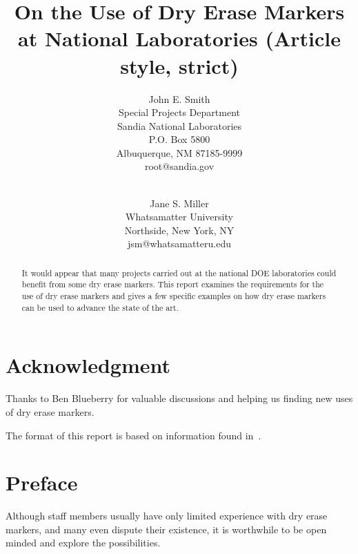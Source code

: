 \documentclass[pdf,ps2pdf,12pt,strict,OUO]{SANDreport}
\title{On the Use of Dry Erase Markers at National Laboratories (Article style, strict)}
\author{John E. Smith \\
	  Special Projects Department \\
	  Sandia National Laboratories\\
	  P.O. Box 5800\\
	  Albuquerque, NM 87185-9999 \\
	  root@sandia.gov \\
	  \\
	  \and
	  Jane S. Miller \\
	  Whatsamatter University \\
	  Northside, New York, NY\\
	  jsm@whatsamatteru.edu
	 }
\date{}
\begin{document}
    \maketitle

    \begin{abstract}
	It would appear that many projects carried out at the
	national DOE laboratories could benefit from some dry erase markers. This
	report examines the requirements for the use of dry erase markers and
	gives a few specific examples on how dry erase markers can be used to
	advance the state of the art.
    \end{abstract}


    \clearpage
    \section*{Acknowledgment}
	Thanks to Ben Blueberry for valuable discussions and helping
	us finding new uses of dry erase markers.

	The format of this report is based on information found
	in~\cite{Sand98-0730}.



    \cleardoublepage		%
    \tableofcontents
    \listoffigures
    \listoftables


    \clearpage
    \section*{Preface}
	Although staff members usually have only limited experience with
	dry erase markers, and many even dispute their existence, it is worthwhile
	to be open minded and explore the possibilities.
\end{document}

